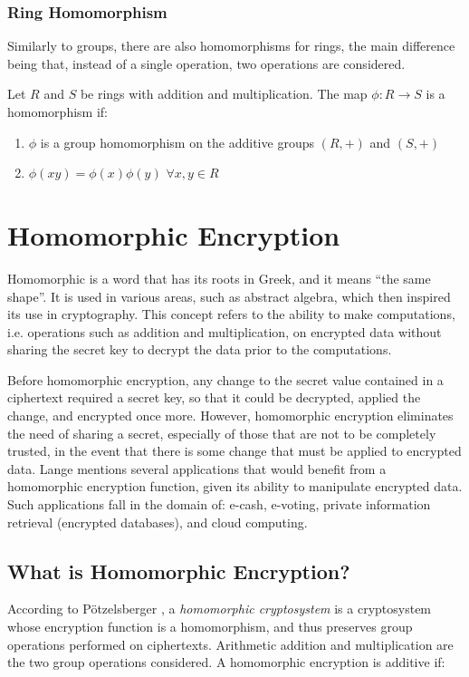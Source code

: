 \subsubsection{Ring Homomorphism}

Similarly to groups, there are also homomorphisms for rings, the main difference being that, instead of a single operation, two operations are considered.

Let $R$ and $S$ be rings with addition and multiplication. The map $\phi: R \rightarrow S$ is a homomorphism if:
\begin{enumerate}
\item $\phi$ is a group homomorphism on the additive groups $(R, +)$ and $(S,+)$
\item $\phi(xy) = \phi(x) \phi(y)$ $\forall x, y \in R$
\end{enumerate}

\section{Homomorphic Encryption}

Homomorphic is a word that has its roots in Greek, and it means ``the same shape''. It is used in various areas, such as abstract algebra, which then inspired its use in cryptography. This concept refers to the ability to make computations, i.e. operations such as addition and multiplication, on encrypted data without sharing the secret key to decrypt the data prior to the computations. 

Before homomorphic encryption, any change to the secret value contained in a ciphertext required a secret key, so that it could be decrypted, applied the change, and encrypted once more. However, homomorphic encryption eliminates the need of sharing a secret, especially of those that are not to be completely trusted, in the event that there is some change that must be applied to encrypted data. 
Lange \cite{langue2011} mentions several applications that would benefit from a homomorphic encryption function, given its ability to manipulate encrypted data. Such applications fall in the domain of: e-cash, e-voting, private information retrieval (encrypted databases), and cloud computing.

\subsection{What is Homomorphic Encryption?}

According to P{\"o}tzelsberger \cite{potzelsberger2013kv}, a \textit{homomorphic cryptosystem} is a cryptosystem whose encryption function is a homomorphism, and thus preserves group operations performed on ciphertexts. Arithmetic addition and multiplication are the two group operations considered.  A homomorphic encryption is additive if:

